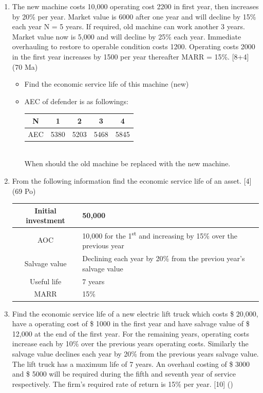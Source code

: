 \documentclass[12pt]{article}
\newcommand{\super}[1]{\textsuperscript{#1}}
\begin{document}
\begin{enumerate}
			\item The new machine costs 10,000 operating cost 2200 in first year, then increases by 20\% per year. Market value is 6000 after one year and will decline by 15\% each year N = 5 years. If required, old machine can work another 3 years. Market value now is 5,000 and will decline by 25\% each year. Immediate overhauling to restore to operable condition costs 1200. Operating costs 2000 in the first year increases by 1500 per year thereafter MARR = 15\%. \hfill [8+4] (70 Ma)\\
			\begin{itemize}[noitemsep, topsep=0pt]
				\item Find the economic service life of this machine (new)
				\item AEC of defender is as followings:\\
				\begin{tabular}{|c|c|c|c|c|}
					\hline
					N & 1 & 2 & 3 & 4 \\ \hline
					AEC & 5380 & 5203 & 5468 & 5845 \\ \hline
				\end{tabular}\\
				When should the old machine be replaced with the new machine.
			\end{itemize}

			\item From the following information find the economic service life of an asset. \hfill [4] (69 Po) \\
			\begin{tabular}{|c|l|}
				\hline
				Initial investment & 50,000 \\ \hline
				AOC & 10,000 for the 1\super{st} and increasing by 15\% over the previous year \\ \hline
				Salvage value & Declining each year by 20\% from the previou year's salvage value \\ \hline
				Useful life & 7 years \\ \hline
				MARR & 15\% \\ \hline
			\end{tabular}

			\item Find the economic service life of a new electric lift truck which costs \$ 20,000, have a operating cost of \$ 1000 in the first year and have salvage value of \$ 12,000 at the end of the first year. For the remaining years,  operating costs increase each by 10\% over the previous years operating costs. Similarly the salvage value declines each year by 20\% from the previous years salvage value. The lift truck has a maximum life of 7 years. An overhaul costing of \$ 3000 and \$ 5000 will be required during the fifth and seventh year of service respectively. The firm's required rate of return is 15\% per year. \hfill [10] ()


\end{enumerate}
\end{document}
